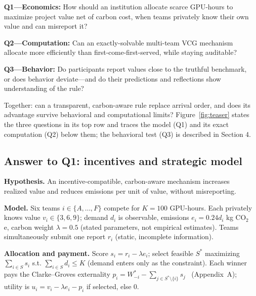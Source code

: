 \vspace{3pt}

\noindent
\textbf{Q1---Economics:} How should an institution allocate scarce GPU-hours to maximize project value net of carbon cost, when teams privately know their own value and can misreport it?\par
\textbf{Q2---Computation:} Can an exactly-solvable multi-team VCG mechanism allocate more efficiently than first-come-first-served, while staying auditable?\par
\textbf{Q3---Behavior:} Do participants report values close to the truthful benchmark, or does behavior deviate---and do their predictions and reflections show understanding of the rule?

\vspace{3pt}

\noindent
Together: can a transparent, carbon-aware rule replace arrival order, and does its advantage survive behavioral and computational limits? Figure~\ref{fig:teaser} states the three questions in its top row and traces the model (Q1) and its exact computation (Q2) below them; the behavioral test (Q3) is described in Section 4.

\subsection{Answer to Q1: incentives and strategic model}

\noindent
\textbf{Hypothesis.} An incentive-compatible, carbon-aware mechanism increases realized value and reduces emissions per unit of value, without misreporting.

\vspace{3pt}

\noindent
\textbf{Model.} Six teams $i\in\{A,\dots,F\}$ compete for $K=100$ GPU-hours. Each privately knows value $v_i \in \{3,6,9\}$; demand $d_i$ is observable, emissions $e_i=0.24d_i$ kg CO$_2$e, carbon weight $\lambda=0.5$ (stated parameters, not empirical estimates). Teams simultaneously submit one report $r_i$ (static, incomplete information).

\vspace{3pt}

\noindent
\textbf{Allocation and payment.} Score $s_i=r_i-\lambda e_i$; select feasible $S^*$ maximizing $\sum_{i\in S}s_i$ s.t. $\sum_{i\in S}d_i\le K$ (demand enters only as the constraint). Each winner pays the Clarke--Groves externality $p_i = W_{-i}^* - \sum_{j\in S^*\setminus\{i\}}s_j$~\cite{clarke1971,groves1973} (Appendix~A); utility is $u_i=v_i-\lambda e_i-p_i$ if selected, else 0.

